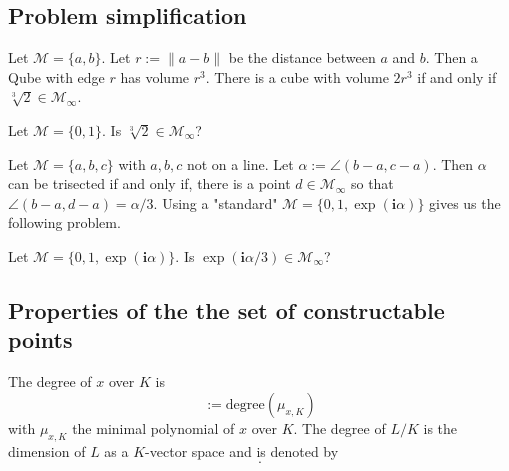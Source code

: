 \documentclass{../Proof_layout_PDF/TemplateExercise}
\begin{document}
\subsection{Problem simplification}
Let $\mathcal{M} = \{a, b\}$. Let $r := \|a - b\|$ be the distance between $a$ and $b$. Then a Qube with edge $r$ has volume $r^3$.
There is a cube with volume $2r^3$ if and only if $\sqrt[3]{2} \in \mathcal{M}_{\infty}$.
\begin{problem}
    Let $\mathcal{M} = \{0,1\}$. Is $\sqrt[3]{2} \in \mathcal{M}_{\infty}$?
\end{problem}
Let $\mathcal{M} = \{a, b, c\}$ with $a, b, c$ not on a line. Let $\alpha := \angle (b - a, c - a) $.
Then $\alpha$ can be trisected if and only if, there is a point $d\in \mathcal{M}_{\infty}$ so that $\angle (b - a, d - a) = \alpha/3$. Using a
"standard" $\mathcal{M} = \{0,1,\exp(\textbf{i} \alpha)\}$ gives us the following problem.
\begin{problem}
    Let $\mathcal{M} = \{0,1,\exp(\textbf{i} \alpha)\}$. Is $\exp(\textbf{i} \alpha/3) \in \mathcal{M}_{\infty}$?
\end{problem}

\subsection{Properties of the the set of constructable points}
\begin{definition}
    The degree of $x$ over $K$ is
    \begin{equation*}
        [x:K] :=\text{degree}(\mu_{x,K})
        \end{equation*}
        with $\mu_{x,K}$ the minimal polynomial of $x$ over $K$. \newline
    The degree of $L/K$ is the dimension of $L$ as a $K$-vector space and is denoted by
    \begin{equation*}
        [L:K].
    \end{equation*}
\end{definition}
\end{document}
